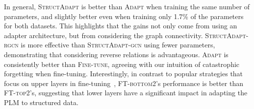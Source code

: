 \documentclass[11pt]{article}
\newcommand{\graphadapter}{{\small\textsc{StructAdapt}}\xspace}
\newcommand{\graphadaptergcn}{{\small\textsc{StructAdapt-gcn}}\xspace}
\newcommand{\graphadapterrgcn}{{\small\textsc{StructAdapt-rgcn}}\xspace}
\newcommand{\vanilladapter}{{\small\textsc{Adapt}}\xspace}
\newcommand{\finetune}{{\small\textsc{Fine-tune}}\xspace}
\newcommand{\finetunetop}{{\small\textsc{FT-top2}}\xspace}
\newcommand{\finetunebottom}{{\small\textsc{FT-bottom2}}\xspace}
\begin{document}
In general, \graphadapter is better than \vanilladapter when training the same number of parameters, and slightly better even when training only 1.7\% of the parameters for both datasets. This highlights that the gains not only come from using an adapter architecture, but from considering the graph connectivity. \graphadapterrgcn is more effective than \graphadaptergcn using fewer parameters, demonstrating that considering reverse relations is advantageous. \vanilladapter is consistently better than \finetune, agreeing with our intuition of catastrophic forgetting when fine-tuning. Interestingly, in contrast to popular strategies that focus on upper layers in fine-tuning~\cite{howard-ruder-2018-universal, pmlr-v97-houlsby19a, li2021prefixtuning}, \finetunebottom's performance is better than \finetunetop's, suggesting that lower layers have a significant impact in adapting the PLM to structured data.
\end{document}
